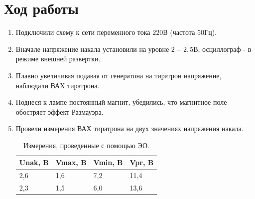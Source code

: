 \documentclass[a4paper]{article}
\begin{document}
\section{Ход работы}
\begin{enumerate}
  \item Подключили схему к сети переменного тока $220В$ (частота $50 Гц$).
  \item Вначале напряжение накала установили на уровне $2 - 2,5 В$, осциллограф - в режиме внешней развертки.
  \item Плавно увеличивая подавая от генератона на тиратрон напряжение, наблюдали ВАХ тиратрона.
  \item Поднеся к лампе постоянный магнит, убедились, что магнитное поле обостряет эффект Размауэра.
  \item Провели измерения ВАХ тиратрона на двух значениях напряжения накала.

  \begin{table}[H]
    \centering
    \begin{tabular}{|l|l|l|l|}
      \hline
    Unak, B & Vmax, B & Vmin, B & Vpr, B \\ \hline
    2,6   & 1,6     & 7,2     & 11,4   \\ \hline
    2,3   & 1,5    & 6,0       & 13,6 \\ \hline
    \end{tabular}
    \caption{Измерения, проведенные с помощью ЭО.}
    \end{table}


\end{enumerate}
\end{document}
